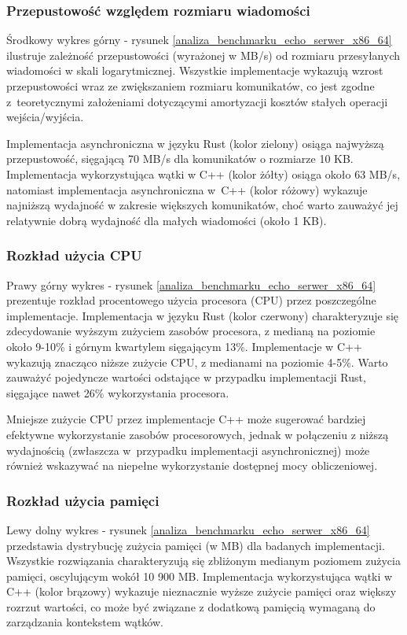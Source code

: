\subsubsection{ Przepustowość względem rozmiaru wiadomości}
Środkowy wykres górny - rysunek \ref{analiza_benchmarku_echo_serwer_x86_64} ilustruje zależność przepustowości (wyrażonej w MB/s) od rozmiaru przesyłanych wiadomości w skali logarytmicznej. Wszystkie implementacje wykazują wzrost przepustowości wraz ze zwiększaniem rozmiaru komunikatów, co jest zgodne z~teoretycznymi założeniami dotyczącymi amortyzacji kosztów stałych operacji wejścia/wyjścia.

Implementacja asynchroniczna w języku Rust (kolor zielony) osiąga najwyższą przepustowość, sięgającą 70 MB/s dla komunikatów o rozmiarze 10 KB. Implementacja wykorzystująca wątki w C++ (kolor żółty) osiąga około 63 MB/s, natomiast implementacja asynchroniczna w~C++ (kolor różowy) wykazuje najniższą wydajność w zakresie większych komunikatów, choć warto zauważyć jej relatywnie dobrą wydajność dla małych wiadomości (około 1 KB).

\subsubsection{Rozkład użycia CPU}
Prawy górny wykres - rysunek \ref{analiza_benchmarku_echo_serwer_x86_64} prezentuje rozkład procentowego użycia procesora (CPU) przez poszczególne implementacje. Implementacja w języku Rust (kolor czerwony) charakteryzuje się zdecydowanie wyższym zużyciem zasobów procesora, z medianą na poziomie około 9-10\% i górnym kwartylem sięgającym 13\%. Implementacje w C++ wykazują znacząco niższe zużycie CPU, z medianami na poziomie 4-5\%. Warto zauważyć pojedyncze wartości odstające w przypadku implementacji Rust, sięgające nawet 26\% wykorzystania procesora.

Mniejsze zużycie CPU przez implementacje C++ może sugerować bardziej efektywne wykorzystanie zasobów procesorowych, jednak w połączeniu z niższą wydajnością (zwłaszcza w~przypadku implementacji asynchronicznej) może również wskazywać na niepełne wykorzystanie dostępnej mocy obliczeniowej.

\subsubsection{Rozkład użycia pamięci}
Lewy dolny wykres - rysunek \ref{analiza_benchmarku_echo_serwer_x86_64} przedstawia dystrybucję zużycia pamięci (w MB) dla badanych implementacji. Wszystkie rozwiązania charakteryzują się zbliżonym medianym poziomem zużycia pamięci, oscylującym wokół 10 900 MB. Implementacja wykorzystująca wątki w C++ (kolor brązowy) wykazuje nieznacznie wyższe zużycie pamięci oraz większy rozrzut wartości, co może być związane z dodatkową pamięcią wymaganą do zarządzania kontekstem wątków.

